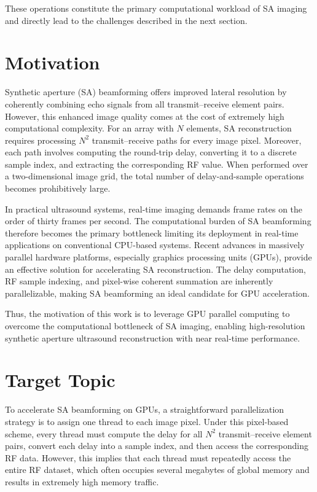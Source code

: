 \documentclass{article}
\begin{document}
These operations constitute the primary computational workload of SA imaging and directly lead to the challenges described in the next section.


\section{Motivation}

Synthetic aperture (SA) beamforming offers improved lateral resolution by coherently combining echo signals from all transmit--receive element pairs. 
However, this enhanced image quality comes at the cost of extremely high computational complexity. 
For an array with $N$ elements, SA reconstruction requires processing $N^2$ transmit--receive paths for every image pixel. 
Moreover, each path involves computing the round-trip delay, converting it to a discrete sample index, and extracting the corresponding RF value. 
When performed over a two-dimensional image grid, the total number of delay-and-sample operations becomes prohibitively large. 

In practical ultrasound systems, real-time imaging demands frame rates on the order of thirty frames per second. 
The computational burden of SA beamforming therefore becomes the primary bottleneck limiting its deployment in real-time applications on conventional CPU-based systems. 
Recent advances in massively parallel hardware platforms, especially graphics processing units (GPUs), provide an effective solution for accelerating SA reconstruction. 
The delay computation, RF sample indexing, and pixel-wise coherent summation are inherently parallelizable, making SA beamforming an ideal candidate for GPU acceleration.

Thus, the motivation of this work is to leverage GPU parallel computing to overcome the computational bottleneck of SA imaging, enabling high-resolution synthetic aperture ultrasound reconstruction with near real-time performance.


\section{Target Topic}


To accelerate SA beamforming on GPUs, a straightforward parallelization strategy is to assign one thread to each image pixel. 
Under this pixel-based scheme, every thread must compute the delay for all $N^2$ transmit--receive element pairs, convert each delay into a sample index, and then access the corresponding RF data. 
However, this implies that each thread must repeatedly access the entire RF dataset, which often occupies several megabytes of global memory and results in extremely high memory traffic.
\end{document}
